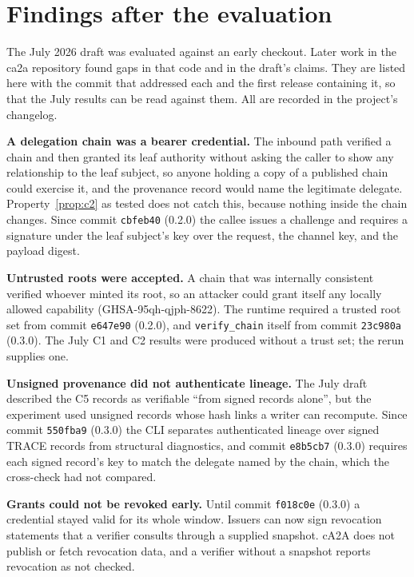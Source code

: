 \section{Findings after the evaluation}\label{sec:after}

The July 2026 draft was evaluated against an early checkout. Later work in the ca2a repository
found gaps in that code and in the draft's claims. They are listed here with the commit that
addressed each and the first release containing it, so that the July results can be read against
them. All are recorded in the project's changelog.

\textbf{A delegation chain was a bearer credential.} The inbound path verified a chain and then
granted its leaf authority without asking the caller to show any relationship to the leaf
subject, so anyone holding a copy of a published chain could exercise it, and the provenance
record would name the legitimate delegate. Property~\ref{prop:c2} as tested does not catch this,
because nothing inside the chain changes. Since commit \texttt{cbfeb40} (0.2.0) the callee issues
a challenge and requires a signature under the leaf subject's key over the request, the channel
key, and the payload digest.

\textbf{Untrusted roots were accepted.} A chain that was internally consistent verified whoever
minted its root, so an attacker could grant itself any locally allowed capability (GHSA-95qh-qjph-8622). The runtime
required a trusted root set from commit \texttt{e647e90} (0.2.0), and \texttt{verify\_chain}
itself from commit \texttt{23c980a} (0.3.0). The July C1 and C2 results were produced without a
trust set; the rerun supplies one.

\textbf{Unsigned provenance did not authenticate lineage.} The July draft described the C5 records
as verifiable ``from signed records alone'', but the experiment used unsigned records whose hash
links a writer can recompute. Since commit \texttt{550fba9} (0.3.0) the CLI separates
authenticated lineage over signed TRACE records from structural diagnostics, and commit
\texttt{e8b5cb7} (0.3.0) requires each signed record's key to match the delegate named by the
chain, which the cross-check had not compared.

\textbf{Grants could not be revoked early.} Until commit \texttt{f018c0e} (0.3.0) a credential
stayed valid for its whole window. Issuers can now sign revocation statements that a verifier
consults through a supplied snapshot. cA2A does not publish or fetch revocation data, and a
verifier without a snapshot reports revocation as not checked.

